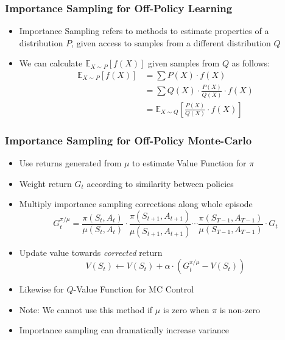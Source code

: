 \documentclass[handout]{beamer}
\begin{document}
\begin{frame}
\frametitle{Importance Sampling for Off-Policy Learning}
\pause
\begin{itemize}[<+->]
\item Importance Sampling refers to methods to estimate properties of a distribution $P$, given access to samples from a different distribution $Q$
\item We can calculate $\mathbb{E}_{X\sim P}[f(X)]$ given samples from $Q$ as follows:
\begin{align*}
\mathbb{E}_{X\sim P}[f(X)] & = \sum P(X) \cdot f(X) \\
& = \sum Q(X) \cdot \frac {P(X)} {Q(X)} \cdot f(X) \\
& = \mathbb{E}_{X \sim Q}[\frac {P(X)} {Q(X)} \cdot f(X)]
\end{align*}
\end{itemize}
\end{frame}

\begin{frame}
\frametitle{Importance Sampling for Off-Policy Monte-Carlo}
\pause
\begin{itemize}[<+->]
\item Use returns generated from $\mu$ to estimate Value Function for $\pi$
\item Weight return $G_t$ according to similarity between policies
\item Multiply importance sampling corrections along whole episode
$$G_t^{\pi / \mu} = \frac {\pi(S_t, A_t)} {\mu(S_t, A_t)} \cdot  \frac {\pi(S_{t+1}, A_{t+1})} {\mu(S_{t+1}, A_{t+1})} \cdots \frac {\pi(S_{T-1}, A_{T-1})} {\mu(S_{T-1}, A_{T-1})} \cdot G_t$$
\item Update value towards {\em corrected} return
$$V(S_t) \leftarrow V(S_t) + \alpha \cdot (G_t^{\pi / \mu} - V(S_t))$$
\item Likewise for $Q$-Value Function for MC Control
\item Note: We cannot use this method if $\mu$ is zero when $\pi$ is non-zero
\item Importance sampling can dramatically increase variance
\end{itemize}
\end{frame}
\end{document}
